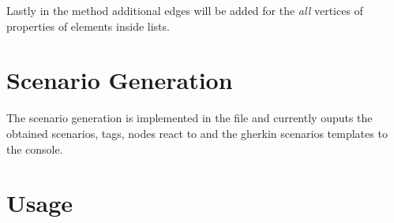Lastly in the  method additional edges will be added for the \textit{all} vertices of properties of elements inside lists.

\section{Scenario Generation}
The scenario generation is implemented in the  file and currently ouputs the obtained scenarios, tags, nodes react to and the gherkin scenarios templates to the console.

\section{Usage}
